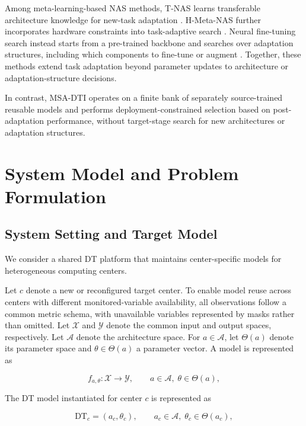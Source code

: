 \documentclass[a4paper,fleqn]{cas-sc}
\begin{document}
Among meta-learning-based NAS methods, T-NAS learns transferable architecture
knowledge for new-task adaptation \cite{ref31}. H-Meta-NAS further incorporates
hardware constraints into task-adaptive search \cite{ref30}. Neural
fine-tuning search instead starts from a pre-trained backbone and searches over
adaptation structures, including which components to fine-tune or augment
\cite{ref32}. Together, these methods extend task adaptation beyond parameter
updates to architecture or adaptation-structure decisions.

In contrast, MSA-DTI operates on a finite bank of separately source-trained
reusable models and performs deployment-constrained selection based on
post-adaptation performance, without target-stage search for new architectures
or adaptation structures.

\section{System Model and Problem Formulation}
\label{sec:problem}

\subsection{System Setting and Target Model}

We consider a shared DT platform that maintains center-specific models for
heterogeneous computing centers.

Let $c$ denote a new or reconfigured target center. To enable model reuse
across centers with different monitored-variable availability, all observations
follow a common metric schema, with unavailable variables represented by masks
rather than omitted. Let $\mathcal{X}$ and $\mathcal{Y}$ denote the common
input and output spaces, respectively. Let $\mathcal{A}$ denote the
architecture space. For $a\in\mathcal{A}$, let $\Theta(a)$ denote its
parameter space and $\theta\in\Theta(a)$ a parameter vector. A model is
represented as

\begin{equation}
f_{a,\theta}:\mathcal{X}\rightarrow\mathcal{Y},
\qquad
a\in\mathcal{A},\;
\theta\in\Theta(a),
\label{eq:model-family}
\end{equation}

The DT model instantiated for center $c$ is represented as

\begin{equation}
\mathrm{DT}_{c}
=
\left(
a_c,\theta_c
\right),
\qquad
a_c\in\mathcal{A},\;
\theta_c\in\Theta(a_c),
\label{eq:dt-instance}
\end{equation}
\end{document}
